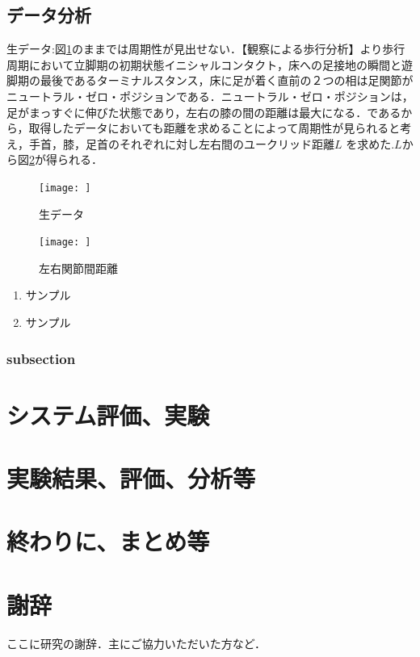 \documentclass[a4j,10.5pt]{jreport}
\begin{document}
\section{データ分析}
生データ:図\ref{fig:originaldata}のままでは周期性が見出せない．【観察による歩行分析】より歩行周期において立脚期の初期状態イニシャルコンタクト，床への足接地の瞬間と遊脚期の最後であるターミナルスタンス，床に足が着く直前の２つの相は足関節がニュートラル・ゼロ・ポジションである．ニュートラル・ゼロ・ポジションは，足がまっすぐに伸びた状態であり，左右の膝の間の距離は最大になる．であるから，取得したデータにおいても距離を求めることによって周期性が見られると考え，手首，膝，足首のそれぞれに対し左右間のユークリッド距離$L$ を求めた.$L$から図\ref{fig:lengthdata}が得られる．
\begin{figure}
    \centering
    \texttt{[image: ]}
    \caption{生データ}
    \label{fig:originaldata}
\end{figure}
\begin{figure}
    \centering
    \texttt{[image: ]}
    \caption{左右関節間距離}
    \label{fig:lengthdata}
\end{figure}
\begin{enumerate}
    \item サンプル
    \item サンプル
\end{enumerate}

\subsection{subsection}

\chapter{システム評価、実験}

\chapter{実験結果、評価、分析等}

\chapter{終わりに、まとめ等}

\chapter*{謝辞}
ここに研究の謝辞．主にご協力いただいた方など．
\end{document}
